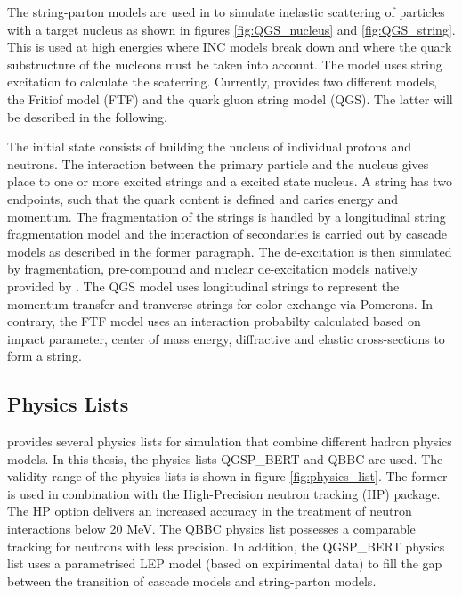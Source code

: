 The string-parton models \cite{Folger2003} are used in \geant to simulate inelastic scattering of particles with a target nucleus as shown in figures \ref{fig:QGS_nucleus} and \ref{fig:QGS_string}. This is used at high energies where INC models break down and where the quark substructure of the nucleons must be taken into account. The model uses string excitation to calculate the scaterring. Currently, \geant provides two different models, the Fritiof model (FTF) and the quark gluon string model (QGS). The latter will be described in the following.

The initial state consists of building the nucleus of individual protons and neutrons. The interaction between the primary particle and the nucleus gives place to one or more excited strings and a excited state nucleus. A string has two endpoints, such that the quark content is defined and caries energy and momentum. The fragmentation of the strings is handled by a longitudinal string fragmentation model and the interaction of secondaries is carried out by cascade models as described in the former paragraph. The de-excitation is then simulated by fragmentation, pre-compound and nuclear de-excitation models natively provided by \geant. The QGS model uses longitudinal strings to represent the momentum transfer and tranverse strings for color exchange via Pomerons. In contrary, the FTF model uses an interaction probabilty calculated based on impact parameter, center of mass energy, diffractive and elastic cross-sections to form a string.

\subsection{\geant Physics Lists}

\geant provides several physics lists for simulation that combine different hadron physics models. In this thesis, the physics lists QGSP\_BERT and QBBC are used. The validity range of the physics lists is shown in figure \ref{fig:physics_list}. The former is used in combination with the High-Precision neutron tracking (HP) package. The HP option delivers an increased accuracy in the treatment of neutron interactions below 20 MeV. The QBBC physics list possesses a comparable tracking for neutrons with less precision.
In addition, the QGSP\_BERT physics list uses a parametrised LEP model (based on expirimental data) to fill the gap between the transition of cascade models and string-parton models.

